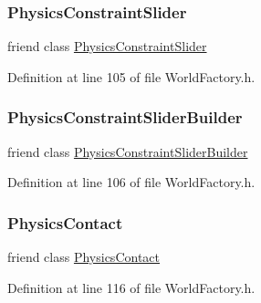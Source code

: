 \subsubsection{\texorpdfstring{Physics\+Constraint\+Slider}{PhysicsConstraintSlider}}
{\footnotesize\ttfamily friend class \mbox{\hyperlink{classnjli_1_1_physics_constraint_slider}{Physics\+Constraint\+Slider}}\hspace{0.3cm}{\ttfamily [friend]}}



Definition at line 105 of file World\+Factory.\+h.

\mbox{\label{classnjli_1_1_world_factory_a6b751cf38f887ce08753757be0cccc26}} 
\subsubsection{\texorpdfstring{Physics\+Constraint\+Slider\+Builder}{PhysicsConstraintSliderBuilder}}
{\footnotesize\ttfamily friend class \mbox{\hyperlink{classnjli_1_1_physics_constraint_slider_builder}{Physics\+Constraint\+Slider\+Builder}}\hspace{0.3cm}{\ttfamily [friend]}}



Definition at line 106 of file World\+Factory.\+h.

\mbox{\label{classnjli_1_1_world_factory_af82a8eac76d39e47206a7eb1917e53f7}} 
\subsubsection{\texorpdfstring{Physics\+Contact}{PhysicsContact}}
{\footnotesize\ttfamily friend class \mbox{\hyperlink{classnjli_1_1_physics_contact}{Physics\+Contact}}\hspace{0.3cm}{\ttfamily [friend]}}



Definition at line 116 of file World\+Factory.\+h.

